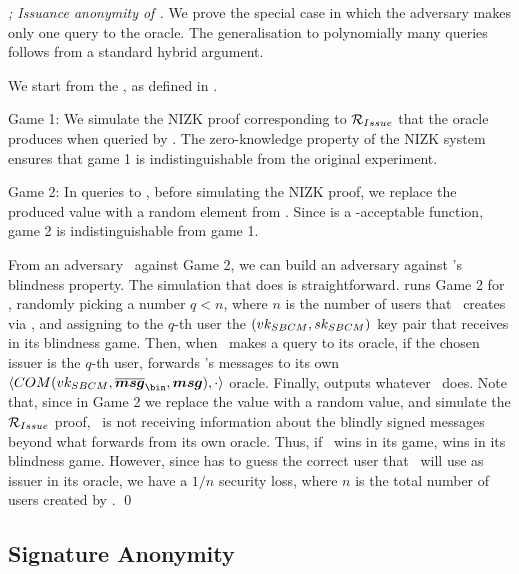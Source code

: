 \begin{proof}[; Issuance anonymity of \CUASGen]
  We prove the special case in which the adversary makes only one query to the
  \OBTCHALb oracle. The generalisation to polynomially many queries follows
  from a standard hybrid argument.

  We start from the \ExpIssAnonb, as defined in . 

  Game 1: We simulate the NIZK proof corresponding to $\mathcal{R}_{Issue}$ that
  the \OBTCHALb oracle produces when queried by \adv. The zero-knowledge
  property of the NIZK system ensures that game 1 is indistinguishable from
  the original experiment.

  Game 2: In queries to \OBTCHALb, before simulating the NIZK proof, we replace
  the produced \yissue value with a random element from \rngfissue. Since
  \fissue is a \UAS-acceptable function, game 2 is indistinguishable from game
  1.

  From an adversary \adv~against Game 2, we can build an adversary \advB against
  \SBCM's blindness property. The simulation that
  \advB does is straightforward. \advB runs Game 2 for \adv, randomly picking
  a number $q < n$, where $n$ is the number of users that \adv~creates via
  \HUGEN, and assigning to the $q$-th user the $(vk_{SBCM},sk_{SBCM})$ key pair
  that \advB receives in its blindness game. Then, when \adv~makes a query
  to its \OBTCHALb oracle, if the chosen issuer is the $q$-th user, \advB
  forwards \adv's messages to its own $\langle COM(\SBCMvk,
  \overline{\smsg}_{\bin},\smsg),\cdot\rangle$ oracle. Finally, \advB outputs
  whatever \adv~does. Note that, since in Game 2 we replace the \yissue value
  with a random value, and simulate the $\mathcal{R}_{Issue}$ proof, \adv~is not
  receiving information about the blindly signed messages beyond what \advB
  forwards from its own oracle. Thus, if \adv~wins in its game, \advB wins in
  its blindness game. However, since \advB has to guess the correct user
  that \adv~will use as issuer in its \OBTCHALb oracle, we have a $1/n$ security
  loss, where $n$ is the total number of users created by \adv.
  \qed
\end{proof}

\subsection{Signature Anonymity}

